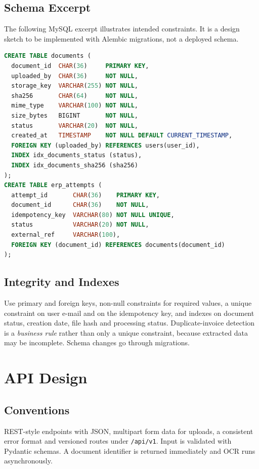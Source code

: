 \documentclass[11pt,a4paper]{report}
\begin{document}
\section{Schema Excerpt}
The following MySQL excerpt illustrates intended constraints. It is a design sketch to be implemented with Alembic migrations, not a deployed schema.
\begin{lstlisting}[language=SQL]
CREATE TABLE documents (
  document_id  CHAR(36)     PRIMARY KEY,
  uploaded_by  CHAR(36)     NOT NULL,
  storage_key  VARCHAR(255) NOT NULL,
  sha256       CHAR(64)     NOT NULL,
  mime_type    VARCHAR(100) NOT NULL,
  size_bytes   BIGINT       NOT NULL,
  status       VARCHAR(20)  NOT NULL,
  created_at   TIMESTAMP    NOT NULL DEFAULT CURRENT_TIMESTAMP,
  FOREIGN KEY (uploaded_by) REFERENCES users(user_id),
  INDEX idx_documents_status (status),
  INDEX idx_documents_sha256 (sha256)
);
CREATE TABLE erp_attempts (
  attempt_id       CHAR(36)    PRIMARY KEY,
  document_id      CHAR(36)    NOT NULL,
  idempotency_key  VARCHAR(80) NOT NULL UNIQUE,
  status           VARCHAR(20) NOT NULL,
  external_ref     VARCHAR(100),
  FOREIGN KEY (document_id) REFERENCES documents(document_id)
);
\end{lstlisting}

\section{Integrity and Indexes}
Use primary and foreign keys, non-null constraints for required values, a unique constraint on user e-mail and on the idempotency key, and indexes on document status, creation date, file hash and processing status. Duplicate-invoice detection is a \emph{business rule} rather than only a unique constraint, because extracted data may be incomplete. Schema changes go through migrations.

\chapter{API Design}
\section{Conventions}
REST-style endpoints with JSON, multipart form data for uploads, a consistent error format and versioned routes under \texttt{/api/v1}. Input is validated with Pydantic schemas. A document identifier is returned immediately and OCR runs asynchronously.
\end{document}
